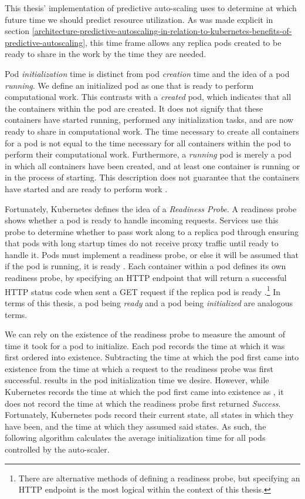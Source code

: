 This thesis' implementation of predictive auto-scaling uses
 to determine at which future time we should predict
resource utilization. As was made explicit in section
\ref{architecture-predictive-autoscaling-in-relation-to-kubernetes-benefits-of-predictive-autoscaling},
this time frame allows any replica pods created to be ready to share in the work by the
time they are needed.

Pod \textit{initialization} time is distinct from pod \textit{creation} time and
the idea of a pod \textit{running}. We define an initialized pod as one that is
ready to perform computational work. This contrasts with a \textit{created} pod,
which indicates that all the containers within the pod are created. It
does not signify that these containers have started running, performed any
initialization tasks, and are now ready to share in computational work. The time
necessary to create all containers for a pod is not equal to the time necessary
for all containers within the pod to perform their computational work.
Furthermore, a \textit{running} pod is merely a pod in which all containers have
been created, and at least one container is running or in the process of
starting. This description does not guarantee that the containers have started
and are ready to perform work \cite{k8s-pod-states}.

Fortunately, Kubernetes defines the idea of a \textit{Readiness Probe}. A
readiness probe shows whether a pod is ready to handle incoming requests.
Services use this probe to determine whether to pass work along to a
replica pod through ensuring that pods with long startup times do not
receive proxy traffic until ready to handle it. Pods must implement a readiness
probe, or else it will be assumed that if the pod is running, it is ready
\cite{k8s-pod-states}. Each container within a pod defines its own readiness
probe, by specifying an HTTP endpoint that will return a successful HTTP status
code when sent a GET request if the replica pod is ready
\cite{k8s-working-with-containers}.\footnote{There are alternative methods of
defining a readiness probe, but specifying an HTTP endpoint is the most logical
within the context of this thesis.} In terms of this thesis, a
pod being \textit{ready} and a pod being \textit{initialized} are analogous
terms.

We can rely on the existence of the readiness probe to
measure the amount of time it took for a pod
to initialize. Each pod records the time at which it was first ordered into
existence. Subtracting the time at which the pod first came into existence
from the time at which a request to the readiness probe was first successful.
results in the pod initialization time we desire. However, while Kubernetes
records the time at which the pod first came into existence as
, it does not record the time at which the
readiness probe first returned \textit{Success}. Fortunately, Kubernetes pods
record their current state, all states in which they have been, and the time
at which they assumed said states. As such, the following algorithm
calculates the average initialization time for all pods controlled by the auto-scaler.

